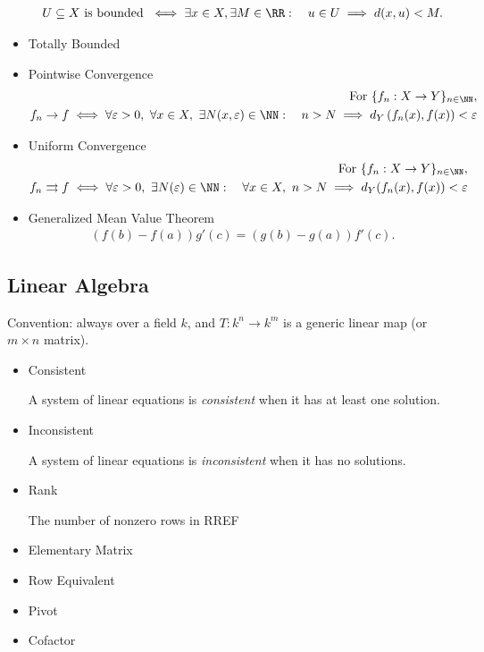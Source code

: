 \begin{itemize}
\begin{align*}
  U \subseteq X \text{ is bounded } \iff \exists x\in X, \exists M \in \RR :\quad u\in U \implies d(x, u) < M
  .\end{align*}
\item
  Totally Bounded 
\item
  Pointwise Convergence
  \begin{align*}
  \text{For}~\{f_n: X \to Y\}_{n\in\NN},\\ f_n \to f \iff
  \forall \varepsilon > 0,~\forall x\in X,~ \exists N(x, \varepsilon)\in\NN :
  \quad n > N \implies d_Y\left(f_n(x),f(x)\right) < \varepsilon
  \end{align*}
\item
  Uniform Convergence
  \begin{align*}
  \text{For}~\{f_n: X \to Y\}_{n\in\NN}, \\
  f_n \rightrightarrows f \iff \forall \varepsilon > 0,~ \exists N(\varepsilon)\in\NN :
  \quad \forall x\in X,~ n > N \implies d_Y(f_n(x), f(x)) < \varepsilon
  \end{align*}
\item
  Generalized Mean Value Theorem
  \begin{align*}  
  (f ( b ) - f ( a ) ) g' ( c ) = (g ( b ) - g ( a )) f' ( c )
  .\end{align*}
\end{itemize}

\hypertarget{linear-algebra-1}{%
\subsection{Linear Algebra}\label{linear-algebra-1}}

Convention: always over a field \(k\), and \(T: k^n \to k^m\) is a
generic linear map (or \(m\times n\) matrix).

\begin{itemize}
\item
  Consistent

  A system of linear equations is \emph{consistent} when it has at least
  one solution.
\item
  Inconsistent

  A system of linear equations is \emph{inconsistent} when it has no
  solutions.
\item
  Rank

  The number of nonzero rows in RREF
\item
  Elementary Matrix
\item
  Row Equivalent
\item
  Pivot
\item
  Cofactor
\end{itemize}

